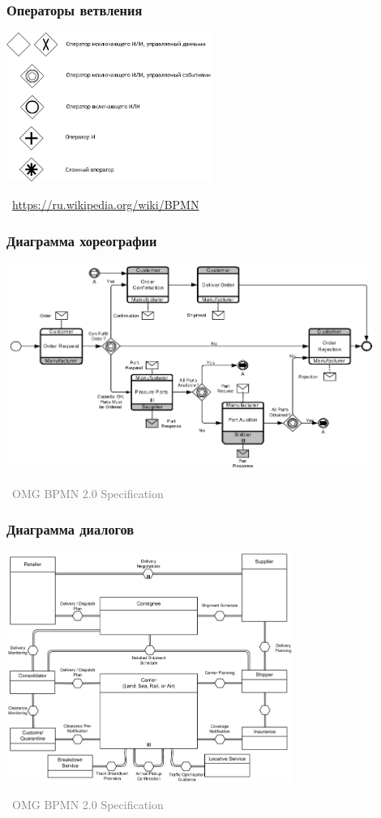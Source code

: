 \documentclass[xetex,mathserif,serif]{beamer}
\newcommand{\attribution}[1] {
    \vspace{-5mm}\begin{flushright}\begin{scriptsize}\textcolor{gray}{\textcopyright\, #1}\end{scriptsize}\end{flushright}
}
\begin{document}
    \begin{frame}
        \frametitle{Операторы ветвления}
        \begin{center}
            \includegraphics[width=0.5\textwidth]{bpmnGateways.png}
            \attribution{\url{https://ru.wikipedia.org/wiki/BPMN}}
        \end{center}
    \end{frame}

    \begin{frame}
        \frametitle{Диаграмма хореографии}
        \begin{center}
            \includegraphics[width=0.9\textwidth]{bpmnChoreography.png}
            \attribution{OMG BPMN 2.0 Specification}
        \end{center}
    \end{frame}

    \begin{frame}
        \frametitle{Диаграмма диалогов}
        \begin{center}
            \includegraphics[width=0.7\textwidth]{bpmnConversation.png}
            \attribution{OMG BPMN 2.0 Specification}
        \end{center}
    \end{frame}
\end{document}
